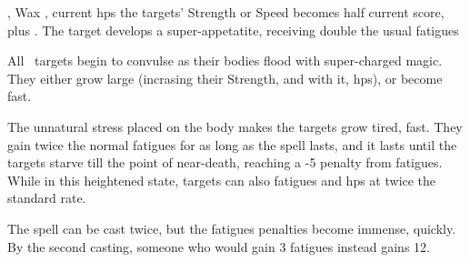   {\mEarth,\mWater}%
  {Wax}%
  {\detailed,\duplicated}%
  {current \glspl{hp}}%
  {the targets' Strength or Speed becomes half current score, plus . The target develops a super-appetatite, receiving double the usual \glspl{fatigue}}%
  {
    All \spellArea\ targets begin to convulse as their bodies flood with super-charged magic.
    They either grow large (incrasing their Strength, and with it, \glspl{hp}), or become fast.

    The unnatural stress placed on the body makes the targets grow tired, fast.
    They gain twice the normal \glspl{fatigue} for as long as the spell lasts, and it lasts until the targets starve till the point of near-death, reaching a -5 penalty from \glspl{fatigue}.
    While in this heightened state, targets can also \glspl{fatigue} and \glspl{hp} at twice the standard rate.

    The spell can be cast twice, but the \glspl{fatigue} penalties become immense, quickly.
    By the second casting, someone who would gain 3 \glspl{fatigue} instead gains 12.
  }

